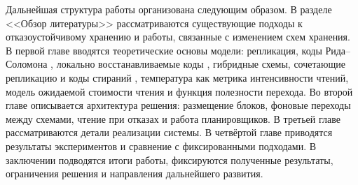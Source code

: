 Дальнейшая структура работы организована следующим образом. В разделе
<<Обзор литературы>> рассматриваются существующие подходы к отказоустойчивому
хранению и работы, связанные с изменением схем хранения. В первой главе
вводятся теоретические основы модели: репликация, коды Рида--Соломона
\cite{reed1960polynomial}, локально восстанавливаемые коды
\cite{gopalan2012lrc,huang2012azure}, гибридные схемы, сочетающие репликацию
и коды стираний \cite{lucani2025hyres}, температура как метрика интенсивности
чтений, модель ожидаемой стоимости чтения и функция полезности перехода. Во
второй главе описывается архитектура решения: размещение блоков, фоновые
переходы между схемами, чтение при отказах и работа планировщиков. В третьей
главе рассматриваются детали реализации системы. В четвёртой главе приводятся
результаты экспериментов и сравнение с фиксированными подходами. В заключении
подводятся итоги работы, фиксируются полученные результаты, ограничения решения
и направления дальнейшего развития.

\pagebreak
